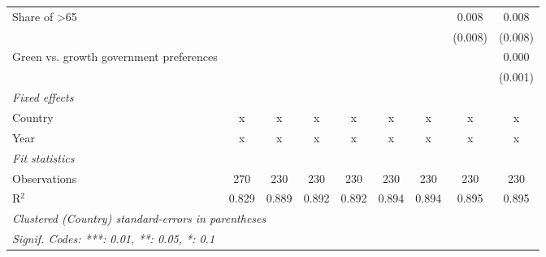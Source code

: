 \begin{table}[htbp]
\begin{tabular}{lcccccccc}
      Share of >65                            &         &         &         &         &         &         & 0.008   & 0.008\\   
                                              &         &         &         &         &         &         & (0.008) & (0.008)\\   
      Green vs. growth government preferences &         &         &         &         &         &         &         & 0.000\\   
                                              &         &         &         &         &         &         &         & (0.001)\\   
      \emph{Fixed effects}\\
      Country                                 & x       & x       & x       & x       & x       & x       & x       & x\\  
      Year                                    & x       & x       & x       & x       & x       & x       & x       & x\\  
      \midrule \emph{Fit statistics}\\
      Observations                            & 270     & 230     & 230     & 230     & 230     & 230     & 230     & 230\\  
      R$^2$                                   & 0.829   & 0.889   & 0.892   & 0.892   & 0.894   & 0.894   & 0.895   & 0.895\\  
      \midrule
      \multicolumn{9}{l}{\emph{Clustered (Country) standard-errors in parentheses}}\\
      \multicolumn{9}{l}{\emph{Signif. Codes: ***: 0.01, **: 0.05, *: 0.1}}\\
   \end{tabular}
\end{table}


